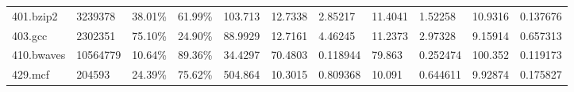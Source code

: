 \documentclass[11pt]{article}
\begin{document}
\begin{landscape}
\begin{table}
\begin{tabular}{lllllllllll}
401.bzip2                                                                                 & 3239378                                                                                      & 38.01\%                                                                                         & 61.99\%                                                                                          & 103.713                                                                                          & 12.7338                           & 2.85217                           & 11.4041                           & 1.52258                           & 10.9316                           & 0.137676                          \\
403.gcc                                                                                   & 2302351                                                                                      & 75.10\%                                                                                         & 24.90\%                                                                                          & 88.9929                                                                                          & 12.7161                           & 4.46245                           & 11.2373                           & 2.97328                           & 9.15914                           & 0.657313                          \\
410.bwaves                                                                                & 10564779                                                                                     & 10.64\%                                                                                         & 89.36\%                                                                                          & 34.4297                                                                                          & 70.4803                           & 0.118944                          & 79.863                            & 0.252474                          & 100.352                           & 0.119173                          \\
429.mcf                                                                                   & 204593                                                                                       & 24.39\%                                                                                         & 75.62\%                                                                                          & 504.864                                                                                          & 10.3015                           & 0.809368                          & 10.091                            & 0.644611                          & 9.92874                           & 0.175827                          \\

\end{tabular}
\end{table}
\end{landscape}
\end{document}
